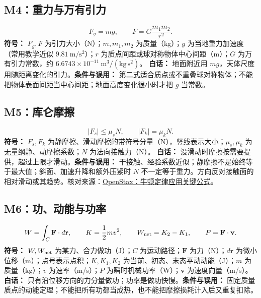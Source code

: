 \subsection{M4：重力与万有引力}
\begin{equation}
F_g=mg,\qquad F=G\frac{m_1m_2}{r^2}.
\end{equation}
\textbf{符号：} $F_g,F$ 为引力大小（N）；$m,m_1,m_2$ 为质量（kg）；$g$ 为当地重力加速度（常用教学近似 $9.81\ \mathrm{m/s^2}$）；$r$ 为质点间距或球对称物体中心间距（m）；$G$ 为万有引力常数，约 $6.6743\times10^{-11}\ \mathrm{m^3/(kg\,s^2)}$。
\textbf{白话：} 地面附近用 $mg$，天体尺度用随距离变化的引力。\textbf{条件与误用：} 第二式适合质点或不重叠球对称物体；不能把物体表面间距当中心间距；地面高度变化很小时才把 $g$ 当常数。

\subsection{M5：库仑摩擦}
\begin{equation}
|F_s|\leq\mu_sN,\qquad |F_k|=\mu_kN.
\end{equation}
\textbf{符号：} $F_s,F_k$ 为静摩擦、滑动摩擦的带符号分量（N），竖线表示大小；$\mu_s,\mu_k$ 为无量纲静、动摩擦系数；$N$ 为法向接触力（N）。
\textbf{白话：} 没滑动时摩擦按需要提供，超过上限才滑动。\textbf{条件与误用：} 干接触、经验系数近似；静摩擦不是始终等于最大值；斜面、加速升降和额外压紧时 $N$ 不一定等于重力。方向反对接触面的相对滑动或其趋势。核对来源：\href{https://openstax.org/books/university-physics-volume-1/pages/6-key-equations}{OpenStax：牛顿定律应用关键公式}。

\subsection{M6：功、动能与功率}
\begin{equation}
W=\int_C\mathbf F\cdot d\mathbf r,\qquad K=\frac12mv^2,\qquad W_{\rm net}=K_2-K_1,\qquad P=\mathbf F\cdot\mathbf v.
\end{equation}
\textbf{符号：} $W,W_{\rm net}$ 为某力、合力做功（J）；$C$ 为运动路径；$\mathbf F$ 为力（N）；$d\mathbf r$ 为微小位移（m）；点号表示点积；$K,K_1,K_2$ 为当前、初态、末态平动动能（J）；$m$ 为质量（kg）；$v$ 为速率（m/s）；$P$ 为瞬时机械功率（W）；$\mathbf v$ 为速度向量（m/s）。
\textbf{白话：} 只有沿位移方向的力分量做功；功率是做功快慢。\textbf{条件与误用：} 固定质量质点的动能定理；不能把所有功都当成热，也不能把摩擦损耗计入后又重复扣除。

